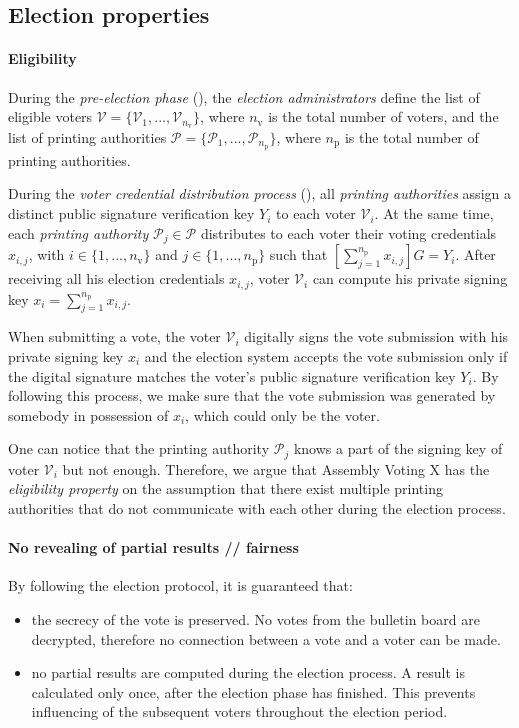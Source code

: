 \subsection{Election properties} \label{sec: election properties}
\paragraph{Eligibility}
During the \textit{pre-election phase} (), the \textit{election administrators} define the list of eligible voters \( \boldsymbol{\mathcal{V}} = \{\mathcal{V}_1, ..., \mathcal{V}_{n_\mathrm{v}}\} \), where $n_\mathrm{v}$ is the total number of voters, and the list of printing authorities \( \boldsymbol{\mathcal{P}} = \{\mathcal{P}_1, ..., \mathcal{P}_{n_\mathrm{p}}\} \), where $n_\mathrm{p}$ is the total number of printing authorities.

During the \textit{voter credential distribution process} (), all \textit{printing authorities} assign a distinct public signature verification key $Y_i$ to each voter $\mathcal{V}_i$. At the same time, each \textit{printing authority} \( \mathcal{P}_j \in \boldsymbol{\mathcal{P}} \) distributes to each voter their voting credentials $x_{i,j}$, with \( i \in \{ 1, ..., n_\mathrm{v} \} \) and \( j \in \{ 1, ..., n_\mathrm{p} \} \) such that \( [\sum_{j=1}^{n_\mathrm{p}} x_{i,j}]G = Y_i \). After receiving all his election credentials $x_{i,j}$, voter $\mathcal{V}_i$ can compute his private signing key \( x_i = \sum_{j=1}^{n_\mathrm{p}} x_{i,j} \).

When submitting a vote, the voter $\mathcal{V}_i$ digitally signs the vote submission with his private signing key $x_i$ and the election system accepts the vote submission only if the digital signature matches the voter's public signature verification key $Y_i$. By following this process, we make sure that the vote submission was generated by somebody in possession of $x_i$, which could only be the voter.

One can notice that the printing authority $\mathcal{P}_j$ knows a part of the signing key of voter $\mathcal{V}_i$ but not enough. Therefore, we argue that Assembly Voting X has the \textit{eligibility property} on the assumption that there exist multiple printing authorities that do not communicate with each other during the election process.

\paragraph{No revealing of partial results // fairness}
By following the election protocol, it is guaranteed that:
\begin{itemize}
    \item the secrecy of the vote is preserved. No votes from the bulletin board are decrypted, therefore no connection between a vote and a voter can be made.
    \item no partial results are computed during the election process. A result is calculated only once, after the election phase has finished. This prevents influencing of the subsequent voters throughout the election period.
\end{itemize}

